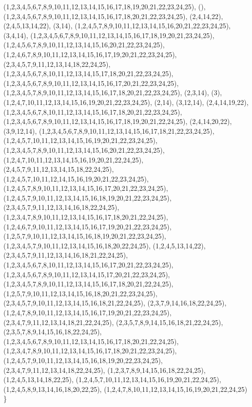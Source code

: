 \documentclass{beamer}
\begin{document}
\begin{frame}
\begin{table}[h]
{{        {(1,2,3,4,5,6,7,8,9,10,11,12,13,14,15,16,17,18,19,20,21,22,23,24,25), (), (1,2,3,4,5,6,7,8,9,10,11,12,13,14,15,16,17,18,20,21,22,23,24,25), (2,4,14,22), (2,4,5,13,14,22), (3,14), (1,2,4,5,7,8,9,10,11,12,13,14,15,16,20,21,22,23,24,25), (3,4,14), (1,2,3,4,5,6,7,8,9,10,11,12,13,14,15,16,17,18,19,20,21,23,24,25), (1,2,4,5,6,7,8,9,10,11,12,13,14,15,16,20,21,22,23,24,25), (1,2,4,6,7,8,9,10,11,12,13,14,15,16,17,19,20,21,22,23,24,25), (2,3,4,5,7,9,11,12,13,14,18,22,24,25), (1,2,3,4,5,6,7,8,10,11,12,13,14,15,17,18,20,21,22,23,24,25), (1,2,3,4,5,6,7,8,9,10,11,12,13,14,15,16,17,20,21,22,23,24,25), (1,2,3,4,5,7,8,9,10,11,12,13,14,15,16,17,18,20,21,22,23,24,25), (2,3,14), (3), (1,2,4,7,10,11,12,13,14,15,16,19,20,21,22,23,24,25), (2,14), (3,12,14), (2,4,14,19,22), (1,2,3,4,5,6,7,8,10,11,12,13,14,15,16,17,18,20,21,22,23,24,25), (1,2,3,4,5,6,7,8,9,10,11,12,13,14,15,16,17,18,19,20,21,22,24,25), (2,4,14,20,22), (3,9,12,14), (1,2,3,4,5,6,7,8,9,10,11,12,13,14,15,16,17,18,21,22,23,24,25), (1,2,4,5,7,10,11,12,13,14,15,16,19,20,21,22,23,24,25), (1,2,3,4,5,7,8,9,10,11,12,13,14,15,16,20,21,22,23,24,25), (1,2,4,7,10,11,12,13,14,15,16,19,20,21,22,24,25), (2,4,5,7,9,11,12,13,14,15,18,22,24,25), (1,2,4,5,7,10,11,12,14,15,16,19,20,21,22,23,24,25), (1,2,4,5,7,8,9,10,11,12,13,14,15,16,17,20,21,22,23,24,25), (1,2,4,5,7,9,10,11,12,13,14,15,16,18,19,20,21,22,23,24,25), (2,3,4,5,7,9,11,12,13,14,16,18,22,24,25), (1,2,3,4,7,8,9,10,11,12,13,14,15,16,17,18,20,21,22,24,25), (1,2,4,6,7,9,10,11,12,13,14,15,16,17,19,20,21,22,23,24,25), (1,2,5,7,9,10,11,12,13,14,15,16,18,19,20,21,22,23,24,25), (1,2,3,4,5,7,9,10,11,12,13,14,15,16,18,20,22,24,25), (1,2,4,5,13,14,22), (2,3,4,5,7,9,11,12,13,14,16,18,21,22,24,25), (1,2,3,4,5,6,7,8,10,11,12,13,14,15,16,17,20,21,22,23,24,25), (1,2,3,4,5,6,7,8,9,10,11,12,13,14,15,17,20,21,22,23,24,25), (1,2,3,4,5,7,8,9,10,11,12,13,14,15,16,17,18,20,21,22,24,25), (1,2,5,7,9,10,11,12,13,14,15,16,18,20,21,22,23,24,25), (2,3,4,5,7,9,10,11,12,13,14,15,16,18,21,22,24,25), (2,3,7,9,14,16,18,22,24,25), (1,2,4,7,8,9,10,11,12,13,14,15,16,17,19,20,21,22,23,24,25), (2,3,4,7,9,11,12,13,14,18,21,22,24,25), (2,3,5,7,8,9,14,15,16,18,21,22,24,25), (2,3,5,7,8,9,14,15,16,18,22,24,25), (1,2,3,4,5,6,7,8,9,10,11,12,13,14,15,16,17,18,20,21,22,24,25), (1,2,3,4,7,8,9,10,11,12,13,14,15,16,17,18,20,21,22,23,24,25), (1,2,4,5,7,9,10,11,12,13,14,15,16,18,19,20,22,23,24,25), (2,3,4,7,9,11,12,13,14,18,22,24,25), (1,2,3,7,8,9,14,15,16,18,22,24,25), (1,2,4,5,13,14,18,22,25), (1,2,4,5,7,10,11,12,13,14,15,16,19,20,21,22,24,25), (1,2,4,5,8,9,13,14,16,18,20,22,25), (1,2,4,7,8,10,11,12,13,14,15,16,19,20,21,22,24,25)}
        \}}}
  \end{table}
\end{frame}
\end{document}
